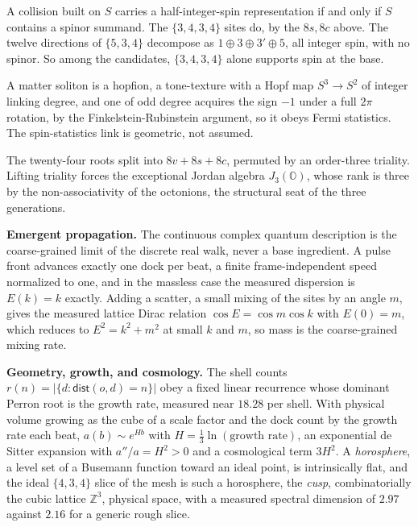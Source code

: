 \begin{proposition}
A collision built on $S$ carries a half-integer-spin representation if and only if $S$ contains a spinor summand. The $\{3,4,3,4\}$ sites do, by the $8s, 8c$ above. The twelve directions of $\{5,3,4\}$ decompose as $1 \oplus 3 \oplus 3' \oplus 5$, all integer spin, with no spinor. So among the candidates, $\{3,4,3,4\}$ alone supports spin at the base.
\end{proposition}

\begin{result}
A matter soliton is a hopfion, a tone-texture with a Hopf map $S^3 \to S^2$ of integer linking degree, and one of odd degree acquires the sign $-1$ under a full $2\pi$ rotation, by the Finkelstein-Rubinstein argument, so it obeys Fermi statistics. The spin-statistics link is geometric, not assumed. \cite{pollard2026vibetest}
\end{result}

\begin{proposition}
The twenty-four roots split into $8v + 8s + 8c$, permuted by an order-three triality. Lifting triality forces the exceptional Jordan algebra $J_3(\mathbb{O})$, whose rank is three by the non-associativity of the octonions, the structural seat of the three generations.
\end{proposition}

\textbf{Emergent propagation.} The continuous complex quantum description is the coarse-grained limit of the discrete real walk, never a base ingredient. A pulse front advances exactly one dock per beat, a finite frame-independent speed normalized to one, and in the massless case the measured dispersion is $E(k) = k$ exactly. Adding a scatter, a small mixing of the sites by an angle $m$, gives the measured lattice Dirac relation $\cos E = \cos m \cos k$ with $E(0) = m$, which reduces to $E^2 = k^2 + m^2$ at small $k$ and $m$, so mass is the coarse-grained mixing rate.

\textbf{Geometry, growth, and cosmology.} The shell counts $r(n) = |\{d : \mathsf{dist}(o,d) = n\}|$ obey a fixed linear recurrence whose dominant Perron root is the growth rate, measured near $18.28$ per shell. With physical volume growing as the cube of a scale factor and the dock count by the growth rate each beat, $a(b) \sim e^{Hb}$ with $H = \tfrac{1}{3}\ln(\text{growth rate})$, an exponential de Sitter expansion with $a''/a = H^2 > 0$ and a cosmological term $3H^2$. A \emph{horosphere}, a level set of a Busemann function toward an ideal point, is intrinsically flat, and the ideal $\{4,3,4\}$ slice of the mesh is such a horosphere, the \emph{cusp}, combinatorially the cubic lattice $\mathbb{Z}^3$, physical space, with a measured spectral dimension of $2.97$ against $2.16$ for a generic rough slice.

